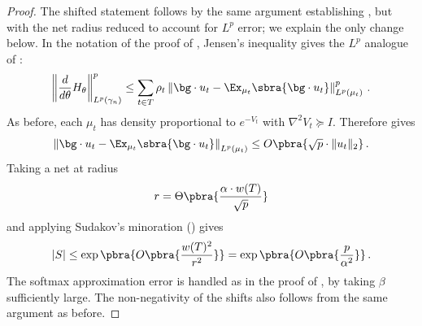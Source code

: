 \documentclass[11pt]{article}
\begin{document}
\begin{proof} 
	The shifted statement follows by the same argument establishing
	, but with the net radius reduced to account for
	$L^p$ error; we explain the only change below. 
	In the notation of the proof of , Jensen's inequality gives the $L^p$ analogue of :
	\[
		\left\|
			\frac{d}{d\theta}H_\theta
		\right\|_{L^p(\gamma_n)}^p
		\leq
		\sum_{t\in T}
		\rho_t
		\left\|
			\bg\cdot u_t-\Ex_{\mu_t}\sbra{\bg\cdot u_t}
		\right\|_{L^p(\mu_t)}^p\,.
	\]
	As before, each $\mu_t$ has density proportional to $e^{-V_t}$ with
	$\nabla^2V_t\succeq I$.  Therefore
	 gives
	\[
		\left\|
			\bg\cdot u_t-\Ex_{\mu_t}\sbra{\bg\cdot u_t}
		\right\|_{L^p(\mu_t)}
		\leq
		O\pbra{\sqrt{p}\cdot\|u_t\|_2}\,.
	\]
	Taking a net at radius
	\[
		r=\Theta\pbra{\frac{\alpha\cdot w(T)}{\sqrt p}}
	\]
	and applying Sudakov's minoration () gives 
	\[
		|S|
		\leq
		\exp\pbra{
			O\pbra{\frac{w(T)^2}{r^2}}
		}
		=
		\exp\pbra{
			O\pbra{\frac{p}{\alpha^2}}
		}\,.
	\]
	The softmax approximation error is handled as in the proof of
	, by taking $\beta$ sufficiently large.  
	The non-negativity of the shifts also follows from the same argument as before. 


\end{proof}
\end{document}
